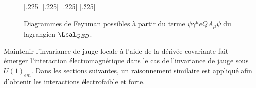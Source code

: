 \begin{figure}[h]
\centering
\vspace{\baselineskip}
[.225\textwidth]
{\vspace{\baselineskip}}
\hfill
{}[.225\textwidth]
{\vspace{\baselineskip}}
\hfill
{}[.225\textwidth]
{\vspace{\baselineskip}}
\hfill
{}[.225\textwidth]
{\vspace{\baselineskip}}

\caption{Diagrammes de Feynman possibles à partir du terme $\bar{\psi}\gamma^\mu eQA_\mu \psi$ du lagrangien $\Lcal_{QED}$.}
\label{fig-fgraph-ff_Gamma}
\end{figure}


\par Maintenir l'invariance de jauge locale à l'aide de la dérivée covariante fait émerger l'interaction électromagnétique dans le cas de l'invariance de jauge sous $U(1)_{em}$.  Dans les sections suivantes, un raisonnement similaire est appliqué afin d'obtenir les interactions électrofaible et forte.